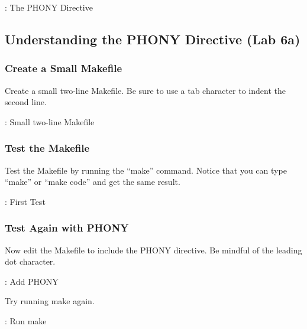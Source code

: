 \justify{}
\begin{mybox}{\thetcbcounter: The PHONY Directive}
	
\end{mybox}

\subsection{Understanding the PHONY Directive (Lab 6a)}

\subsubsection{Create a Small Makefile}
\justify{}
Create a small two-line Makefile. Be sure to use a tab character to indent the second line.

\begin{mybox}{\thetcbcounter: Small two-line Makefile}
	
\end{mybox}

\subsubsection{Test the Makefile}

\justify{}
Test the Makefile by running the ``make'' command. Notice that you can
type ``make'' or ``make code'' and get the same result.

\begin{mybox}{\thetcbcounter: First Test}
	
\end{mybox}

\subsubsection{Test Again with PHONY}

\justify{}
Now edit the Makefile to include the PHONY directive. Be mindful of the
leading dot character.

\begin{mybox}{\thetcbcounter: Add PHONY}
	
\end{mybox}

\justify{}
Try running make again.

\begin{mybox}{\thetcbcounter: Run make}
	
\end{mybox}

